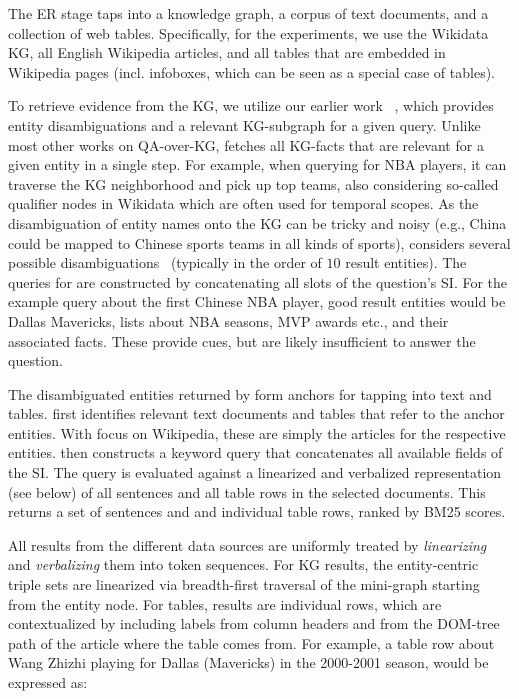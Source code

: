The ER stage taps into a knowledge graph, a corpus of text documents, and a collection of web tables.
Specifically, for the experiments, we use the Wikidata KG,
all English Wikipedia articles, and all tables that are embedded in Wikipedia pages (incl. infoboxes, which can be seen as a special case of tables). 

\vspace{0.2cm}
To retrieve evidence from the KG, we utilize our earlier work
\clocq~\cite{Christmann-CLOCQ:WSDM2022}, which provides entity disambiguations and a relevant KG-subgraph for a given query.
Unlike most other works on QA-over-KG, \clocq fetches all KG-facts that are relevant for a given entity in a single step.
For example, when querying for
NBA players, it can traverse the KG neighborhood and pick up top teams, also considering so-called qualifier nodes in Wikidata which are often used for temporal scopes. 
As the disambiguation of entity names onto the KG can be tricky and noisy (e.g., China could be mapped to Chinese sports teams in all kinds of sports), \clocq considers several possible disambiguations~\cite{Christmann-CLOCQ:WSDM2022} (typically in the order of $10$ result entities).
The queries for \clocq are 
constructed by concatenating all slots of the question's SI.
For the example query about the first Chinese NBA player,
good result entities would be Dallas Mavericks, lists about NBA seasons, MVP awards etc., and their associated facts. These provide cues, but are likely insufficient to answer the question.


\vspace{0.2cm}
The disambiguated entities returned by \clocq form anchors for tapping into text and tables.
\method first identifies 
relevant text documents and tables that refer to the anchor entities. With focus on Wikipedia, these are simply the articles for the respective entities. 
\method then constructs a keyword query that concatenates all available fields of the SI.
The query is evaluated against a linearized and verbalized representation (see below) of all sentences and all table rows in the selected documents.
This returns a set of sentences and 
and individual table rows, ranked by BM25 scores.


\vspace{0.2cm}
All results from the different data sources are uniformly treated by {\em linearizing} and {\em verbalizing} them
into token sequences. For KG results, the entity-centric triple sets are linearized via breadth-first traversal of the mini-graph starting from the entity node.
For tables, results are individual rows, which are contextualized by including labels from column headers and from the DOM-tree path of the article where the table comes from. For example, a table row about Wang Zhizhi playing for Dallas (Mavericks) in the 2000-2001 season, would be expressed as:

